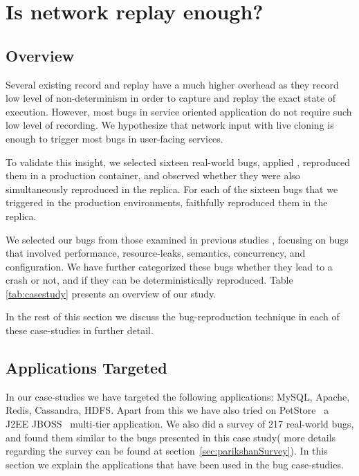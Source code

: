 \chapter{Is network replay enough?}

\section{Overview}
\label{sec:netReplayOverview}

Several existing record and replay have a much higher overhead as they record low level of non-determinism in order to capture and replay the exact state of execution. 
However, most bugs in service oriented application do not require such low level of recording.
We hypothesize that network input with live cloning is enough to trigger most bugs in user-facing services.

To validate this insight, we selected sixteen real-world bugs, applied \parikshan, reproduced them in a production container, and observed whether they were also simultaneously reproduced in the replica.
For each of the sixteen bugs that we triggered in the production environments, \parikshan faithfully reproduced them in the replica. 

We selected our bugs from those examined in previous studies \cite{bugbench,simpleTesting}, focusing on bugs that involved performance, resource-leaks, semantics, concurrency, and configuration. 
We have further categorized these bugs whether they lead to a crash or not, and if they can be deterministically reproduced.
Table \ref{tab:casestudy} presents an overview of our study.

In the rest of this section we discuss the bug-reproduction technique in each of these case-studies in further detail.



\section{Applications Targeted}

In our case-studies we have targeted the following applications: MySQL, Apache, Redis, Cassandra, HDFS. Apart from this we have also tried \parikshan on PetStore~\cite{petstore} a J2EE JBOSS~\cite{jboss} multi-tier application. We also did a survey of 217 real-world bugs, and found them similar to the bugs presented in this case study( more details regarding the survey can be found at section~\ref{sec:parikshanSurvey}).
In this section we explain the applications that have been used in the bug case-studies.

